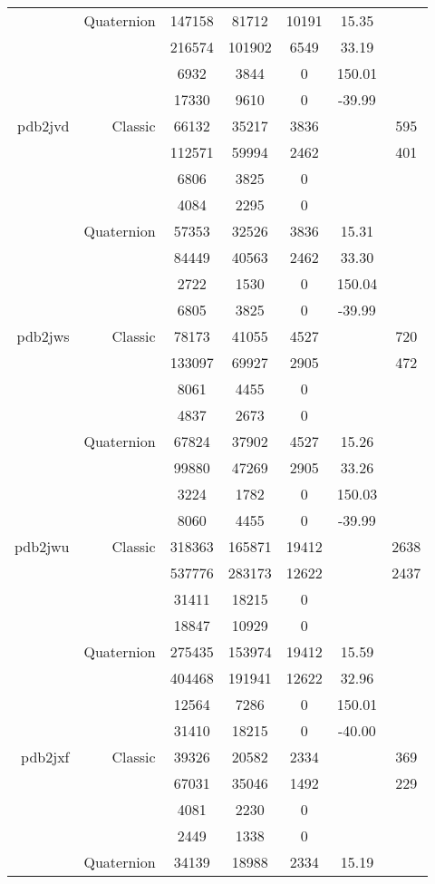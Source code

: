 \begin{xltabular}{\textwidth}{r|rcccSc}
& Quaternion & 147158 & 81712 & 10191 & 15.35 & \\
& & 216574 & 101902 & 6549 & 33.19 & \\
& & 6932 & 3844 & 0 & 150.01 & \\
& & 17330 & 9610 & 0 & -39.99 & \\ \addlinespace
pdb2jvd & Classic & 66132 & 35217 & 3836 & & 595 \\
& & 112571 & 59994 & 2462 & & 401 \\
& & 6806 & 3825 & 0 & & \\
& & 4084 & 2295 & 0 & & \\
& Quaternion & 57353 & 32526 & 3836 & 15.31 & \\
& & 84449 & 40563 & 2462 & 33.30 & \\
& & 2722 & 1530 & 0 & 150.04 & \\
& & 6805 & 3825 & 0 & -39.99 & \\ \addlinespace
pdb2jws & Classic & 78173 & 41055 & 4527 & & 720 \\
& & 133097 & 69927 & 2905 & & 472 \\
& & 8061 & 4455 & 0 & & \\
& & 4837 & 2673 & 0 & & \\
& Quaternion & 67824 & 37902 & 4527 & 15.26 & \\
& & 99880 & 47269 & 2905 & 33.26 & \\
& & 3224 & 1782 & 0 & 150.03 & \\
& & 8060 & 4455 & 0 & -39.99 & \\ \addlinespace
pdb2jwu & Classic & 318363 & 165871 & 19412 & & 2638 \\
& & 537776 & 283173 & 12622 & & 2437 \\
& & 31411 & 18215 & 0 & & \\
& & 18847 & 10929 & 0 & & \\
& Quaternion & 275435 & 153974 & 19412 & 15.59 & \\
& & 404468 & 191941 & 12622 & 32.96 & \\
& & 12564 & 7286 & 0 & 150.01 & \\
& & 31410 & 18215 & 0 & -40.00 & \\ \addlinespace
pdb2jxf & Classic & 39326 & 20582 & 2334 & & 369 \\
& & 67031 & 35046 & 1492 & & 229 \\
& & 4081 & 2230 & 0 & & \\
& & 2449 & 1338 & 0 & & \\
& Quaternion & 34139 & 18988 & 2334 & 15.19 & \\

\end{xltabular}
